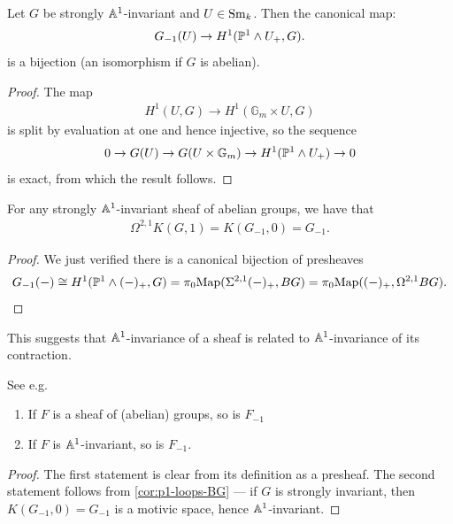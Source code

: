 \documentclass[11pt,openany]{book}
\let\smashprod\wedge
\begin{document}
\begin{lemma} \cite[2.34]{Morel} Let $G$ be strongly $\mathbb{A}^1$-invariant and $U \in \mathrm{Sm}_k$. Then the canonical map:
\begin{align*}
    G_{-1}(U) \to H^1(\P^1 \smashprod  U_+, G).
\end{align*}
is a bijection (an isomorphism if $G$ is abelian).
\end{lemma}
\begin{proof} The map
\begin{align*}
    H^1(U,G)  \to H^1(\mathbb{G}_m \times U,G)
\end{align*}
is split by evaluation at one and hence injective, so the sequence
\begin{align*}
    0 \to G(U) \to G(U \times \mathbb{G}_m) \to H^1(\P^1 \smashprod U_+) \to 0
\end{align*}
is exact, from which the result follows.
\end{proof}


\begin{corollary}\label{cor:p1-loops-BG} 
For any strongly $\mathbb{A}^1$-invariant sheaf of abelian groups, we have that 
\begin{align*}
    \Omega^{2,1} K(G,1) = K(G_{-1},0) = G_{-1}.
\end{align*}
\end{corollary}
\begin{proof} We just verified there is a canonical bijection of presheaves
\begin{align*}
    G_{-1}(-) \cong H^1(\P^1 \smashprod (-)_+, G) = \pi_0 \Map( \Sigma^{2,1} (-)_+, BG) = \pi_0 \Map ( (-)_+, \Omega^{2,1} BG).
\end{align*}
\end{proof}

This suggests that $\mathbb{A}^1$-invariance of a sheaf is related to $\mathbb{A}^1$-invariance of its contraction.


\begin{proposition} See e.g. \cite[\S4.1]{bachmannstrongly}
\begin{enumerate}
    \item If $F$ is a sheaf of (abelian) groups, so is $F_{-1}$
    \item If $F$ is $\mathbb{A}^1$-invariant, so is $F_{-1}$.
\end{enumerate}
\end{proposition}
\begin{proof} The first statement is clear from its definition as a presheaf. The second statement follows from \autoref{cor:p1-loops-BG} --- if $G$ is strongly invariant, then $K(G_{-1},0) = G_{-1}$ is a motivic space, hence $\mathbb{A}^1$-invariant.
\end{proof}
\end{document}
